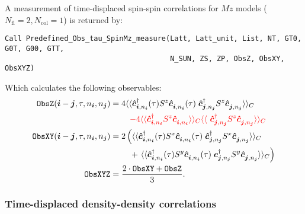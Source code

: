 A measurement of time-displaced spin-spin correlations for $M\!z$ models ($N_\text{fl} = 2, N_\text{col} = 1$)  is returned by:
\begin{lstlisting}[style=fortran]
Call Predefined_Obs_tau_SpinMz_measure(Latt, Latt_unit, List, NT, GT0, G0T, G00, GTT,
                                       N_SUN, ZS, ZP, ObsZ, ObsXY, ObsXYZ)
\end{lstlisting}
Which calculates the following observables:
\begin{align}
\texttt{ObsZ}(\ve{i} - \ve{j}, \tau, n_{\ve{i}},  n_{\ve{j}} ) &= \begin{multlined}[t] 4 \langle \langle \ve{\hat{c}}^{\dagger}_{\ve{i}, n_{\ve{i}}}(\tau)  S^z \ve{\hat{c}}^{\phantom\dagger}_{\ve{i}, n_{\ve{i}} }(\tau)   \;  \ve{\hat{c}}^{\dagger}_{\ve{j}, n_{\ve{j}}} S^z  \ve{\hat{c}}^{\phantom\dagger}_{\ve{j}, n_{\ve{j}}}\rangle \rangle_{C} \\ {\color{red}
- 4 \langle \langle \ve{\hat{c}}^{\dagger}_{\ve{i}, n_{\ve{i}}} S^z \ve{\hat{c}}^{\phantom\dagger}_{\ve{i}, n_{\ve{i}} } \rangle \rangle_{C}  \langle \langle \  \ve{\hat{c}}^{\dagger}_{\ve{j}, n_{\ve{j}}} S^z  \ve{\hat{c}}^{\phantom\dagger}_{\ve{j}, n_{\ve{j}}}\rangle \rangle_{C}  } \end{multlined} \nonumber \\  
\texttt{ObsXY} (\ve{i} - \ve{j}, \tau, n_{\ve{i}},  n_{\ve{j}} ) &=\begin{multlined}[t] 
2 \left( \langle \langle \ve{\hat{c}}^{\dagger}_{\ve{i}, n_{\ve{i}}}(\tau) S^x \ve{\hat{c}}^{\phantom\dagger}_{\ve{i}, n_{\ve{i}} } (\tau)  \;  \ve{\hat{c}}^{\dagger}_{\ve{j}, n_{\ve{j}}} S^x  
\ve{\hat{c}}^{\phantom\dagger}_{\ve{j}, n_{\ve{j}}}\rangle \rangle_{C}  \right.\\
+ \left. \langle \langle \ve{\hat{c}}^{\dagger}_{\ve{i}, n_{\ve{i}}}(\tau) S^y \ve{\hat{c}}^{\phantom\dagger}_{\ve{i}, n_{\ve{i}} }(\tau)   \;  \ve{c}^{\dagger}_{\ve{j}, n_{\ve{j}}} S^y  \ve{\hat{c}}^{\phantom\dagger}_{\ve{j}, n_{\ve{j}}}\rangle \rangle_{C}  \right)  \end{multlined}  \nonumber \\
\texttt{ObsXYZ} &= \frac{2\cdot\texttt{ObsXY} + \texttt{ObsZ}}{3}.
\end{align}


\subsubsection{Time-displaced density-density correlations}

